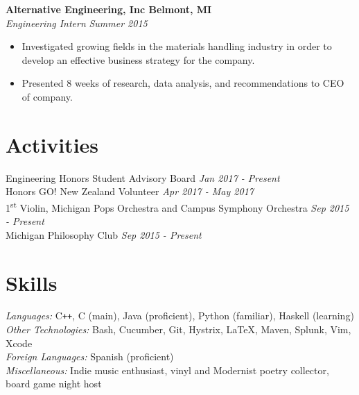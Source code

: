 \documentclass[margin,line]{resume}
\begin{document}
\begin{resume}
    \vspace{-2.5mm}
    \textbf{Alternative Engineering, Inc \hfill Belmont, MI} \\\vspace{1mm}%
    \textsl{Engineering Intern} \hfill \textsl{Summer 2015}
    \begin{itemize}
    \item Investigated growing fields in the materials handling industry in order to develop an effective business strategy for the company. 
    \item Presented 8 weeks of research, data analysis, and recommendations to CEO of company.
    \end{itemize}
    \vspace{2.5mm}

   \sectionbreak
   \vspace{-2.5mm}
   \section{\mysidestyle Activities}
   \begin{flushright}
   \vspace{-7.5mm}
    Engineering Honors Student Advisory Board	\hfill  \textsl{Jan 2017 - Present} \\
    Honors GO! New Zealand Volunteer \hfill \textsl{Apr 2017 - May 2017} \\
    1\textsuperscript{st} Violin, Michigan Pops Orchestra and Campus Symphony Orchestra \hfill \textsl{Sep 2015 - Present}\\
    Michigan Philosophy Club \hfill \textsl{Sep 2015 - Present}
    \end{flushright}
    \vspace{-1.5mm}
    
    \sectionbreak
    \vspace{-2.5mm}
    \section{\mysidestyle Skills}
    \emph{Languages:} C\texttt{++}, C (main), Java (proficient), Python (familiar), Haskell (learning) \\
    \emph{Other Technologies:} Bash, Cucumber, Git, Hystrix, \LaTeX, Maven, Splunk, Vim, Xcode \\
    \emph{Foreign Languages:} Spanish (proficient) \\
    \emph{Miscellaneous:}  Indie music enthusiast, vinyl and Modernist poetry collector, board game night host \end{resume}
\end{document}
